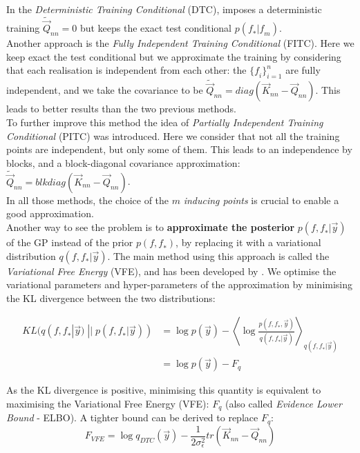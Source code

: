  In the \textit{Deterministic Training Conditional} (DTC), imposes a deterministic training $\tilde{\vec{Q}}_{nn} = 0$ but keeps the exact test conditional $p(\mathit{f}_* | \mathit{f}_m)$.  \\
 
 Another approach is the \textit{Fully Independent Training Conditional} (FITC). Here we keep exact the test conditional but we approximate the training by considering that each realisation is independent from each other: the $\{\mathit{f}_i\}^n_{i=1}$ are fully independent, and we take the covariance to be $\tilde{\vec{Q}}_{nn} = diag(\vec{K}_{nn} - \vec{Q}_{nn} ) $. This leads to better results than the two previous methods. \\
 
 To further improve this method the idea of \textit{Partially Independent Training Conditional} (PITC) was introduced. Here we consider that not all the training points are independent, but only some of them. This leads to an independence by blocks, and a block-diagonal covariance approximation: $\tilde{\vec{Q}}_{nn} = blkdiag(\vec{K}_{nn} - \vec{Q}_{nn} ) $. \\ 
 
In all those methods, the choice of the $m$ \textit{inducing points} is crucial to enable a good approximation. \\


Another way to see the problem is to \textbf{approximate the posterior} $p(\mathit{f,f_*} | \vec{y})$ of the GP instead of the prior $p(\mathit{f,f_*})$, by replacing it with a variational distribution  $q(\mathit{f,f_*} | \vec{y})$. The main method using this approach is called the \textit{Variational Free Energy} (VFE), and has been developed by \cite{titsias_variational_2009}. We optimise the variational parameters and hyper-parameters of the  approximation by minimising the KL divergence between the two distributions: 


\begin{align}
    KL(q(\mathit{f,f_*} | \vec{y})\; || \;  p(\mathit{f,f_*} | \vec{y})) &= \log p(\vec{y}) - \left\langle  \log \frac{p(\mathit{f,f_*},\vec{y})}{q(\mathit{f,f_*} | \vec{y})}\right\rangle_{q(\mathit{f,f_*} | \vec{y})} \\
    &= \log p(\vec{y}) - F_q
    \label{equ:vfe_kl}
    \end{align}  
    
As the KL divergence is positive, minimising this quantity is equivalent to maximising the Variational Free Energy (VFE): $F_q$ (also called \textit{Evidence Lower Bound} - ELBO). A tighter bound can be derived to replace $F_q$: 
\begin{equation}
    F_{VFE} = \log q_{DTC}(\vec{y}) - \frac{1}{2\sigma_\epsilon^2} tr(\vec{K}_{nn} - \vec{Q}_{nn})
\end{equation}

